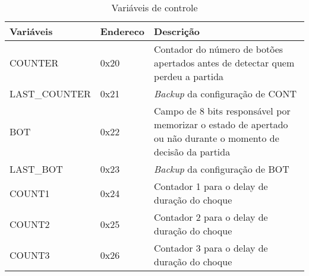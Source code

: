 \documentclass[a4paper,10pt]{article}
\begin{document}
\begin{table}
  \centering
  \caption{Variáveis de controle}
  \vspace{0.5cm}
  \label{tab:variaveis}
  \begin{tabular}{|p{3cm}|p{1.4cm}|p{6.6cm}|} \hline
    Variáveis 		& Endereco & Descrição 						\\ \hline
    COUNTER		& 0x20	   & Contador do número de botões apertados antes
				     de detectar quem perdeu a partida			\\ \hline
    LAST\_COUNTER	& 0x21	   & \textit{Backup} da configuração de CONT		\\ \hline
    BOT			& 0x22	   & Campo de 8 bits responsável por memorizar
				     o estado de apertado ou não durante o 
				     momento de decisão da partida			\\ \hline
    LAST\_BOT		& 0x23	   & \textit{Backup} da configuração de BOT 		\\ \hline  
    COUNT1		& 0x24	   & Contador 1 para o delay de duração do choque	\\ \hline
    COUNT2		& 0x25	   & Contador 2 para o delay de duração do choque	\\ \hline
    COUNT3		& 0x26	   & Contador 3 para o delay de duração do choque	\\ \hline
  \end{tabular}
\end{table}
\end{document}
